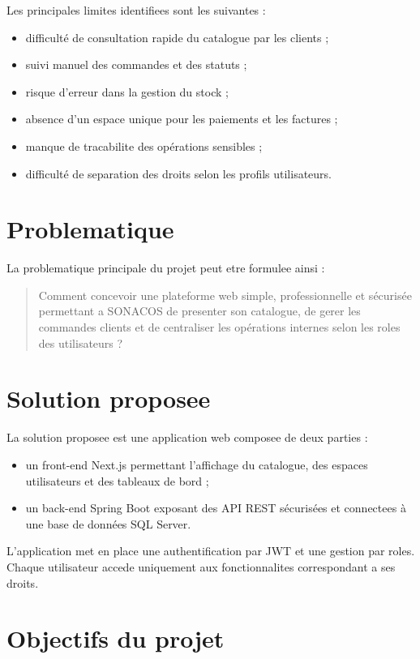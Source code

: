 \documentclass[12pt,a4paper]{report}
\begin{document}
Les principales limites identifiees sont les suivantes :

\begin{itemize}
  \item difficulté de consultation rapide du catalogue par les clients ;
  \item suivi manuel des commandes et des statuts ;
  \item risque d'erreur dans la gestion du stock ;
  \item absence d'un espace unique pour les paiements et les factures ;
  \item manque de tracabilite des opérations sensibles ;
  \item difficulté de separation des droits selon les profils utilisateurs.
\end{itemize}

\section{Problematique}

La problematique principale du projet peut etre formulee ainsi :

\begin{quote}
Comment concevoir une plateforme web simple, professionnelle et sécurisée permettant a SONACOS de presenter son catalogue, de gerer les commandes clients et de centraliser les opérations internes selon les roles des utilisateurs ?
\end{quote}

\section{Solution proposee}

La solution proposee est une application web composee de deux parties :

\begin{itemize}
  \item un front-end Next.js permettant l'affichage du catalogue, des espaces utilisateurs et des tableaux de bord ;
  \item un back-end Spring Boot exposant des API REST sécurisées et connectees à une base de données SQL Server.
\end{itemize}

L'application met en place une authentification par JWT et une gestion par roles. Chaque utilisateur accede uniquement aux fonctionnalites correspondant a ses droits.

\section{Objectifs du projet}
\end{document}

